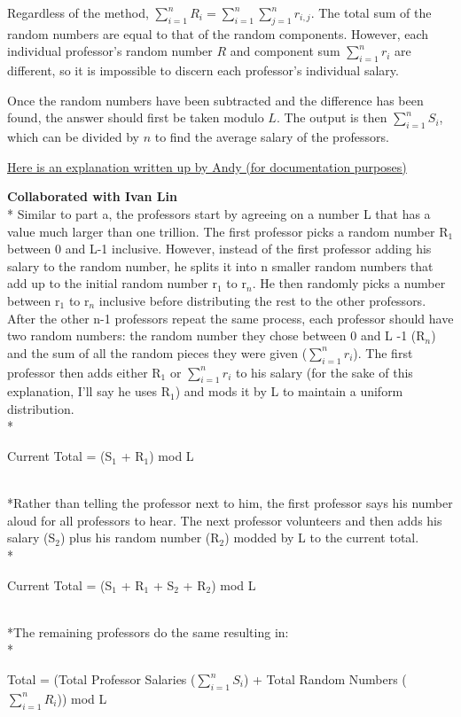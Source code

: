 \documentclass{article}
\begin{document}
Regardless of the method, $\sum_{i=1}^n R_i = \sum_{i=1}^n \sum_{j=1}^n r_{i,j}$. The total sum of the random numbers are equal to that of the random components. However, each individual professor's random number $R$ and component sum $\sum_{i=1}^n r_i$ are different, so it is impossible to discern each professor's individual salary.\newline

Once the random numbers have been subtracted and the difference has been found, the answer should first be taken modulo $L$. The output is then $\sum_{i=1}^n S_i$, which can be divided by $n$ to find the average salary of the professors.

\newpage
\underline{Here is an explanation written up by Andy (for documentation purposes)}

\noindent
\textbf{Collaborated with Ivan Lin}
\\* Similar to part a, the professors start by agreeing on a number L that has a value much larger than one trillion. The first professor picks a random number R$_1$ between 0 and L-1 inclusive. However, instead of the first professor adding his salary to the random number, he splits it into n smaller random numbers that add up to the initial random number r$_1$ to r$_n$. He then randomly picks a number between r$_1$ to r$_n$ inclusive before distributing the rest to the other professors. After the other n-1 professors repeat the same process, each professor should have two random numbers: the random number they chose between 0 and L -1 (R$_n$) and the sum of all the random pieces they were given ($\sum_{i=1}^{n} r_{i}$). 
The first professor then adds either R$_1$ or $\sum_{i=1}^{n} r_{i}$ to his salary (for the sake of this explanation, I'll say he uses R$_1$) and mods it by L to maintain a uniform distribution. 
\smallskip
\\*\centerline{Current Total = (S$_1$ + R$_1$) mod L}
\smallskip 
\\*Rather than telling the professor next to him, the first professor says his number aloud for all professors to hear. The next professor volunteers and then adds his salary (S$_2$) plus his random number (R$_2$) modded by L to the current total.
\\*\centerline{Current Total = (S$_1$ + R$_1$ + S$_2$ + R$_2$) mod L}
\smallskip
\\*The remaining professors do the same resulting in:
\smallskip
\\*\centerline{Total = (Total Professor Salaries ($\sum_{i=1}^{n} S_{i}$) + Total Random Numbers ($\sum_{i=1}^{n} R_{i}$)) mod L}
\end{document}
